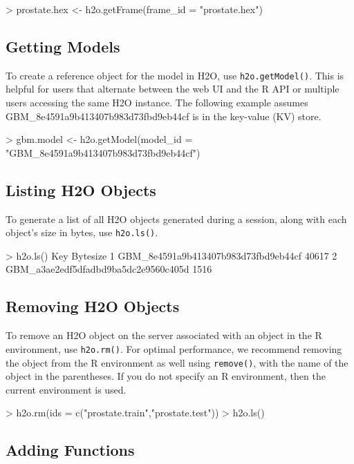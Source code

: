 \begin{spverbatim}
> prostate.hex <- h2o.getFrame(frame_id = "prostate.hex")
\end{spverbatim}


\subsection{Getting Models}
To create a reference object for the model in H2O, use {\texttt{h2o.getModel()}}. This is helpful for  users that alternate between the web UI and the R API or multiple users accessing the same H2O instance. The following example assumes GBM_8e4591a9b413407b983d73fbd9eb44cf is in the key-value (KV) store.
\begin{spverbatim}
> gbm.model <- h2o.getModel(model_id = "GBM_8e4591a9b413407b983d73fbd9eb44cf")
\end{spverbatim}

\subsection{Listing H2O Objects}

To generate a list of all H2O objects generated during a session, along with each object’s size in bytes, use {\texttt{h2o.ls()}}.

\begin{spverbatim}
> h2o.ls()
                                                   Key       Bytesize
      1               GBM_8e4591a9b413407b983d73fbd9eb44cf    40617
      2               GBM_a3ae2edf5dfadbd9ba5dc2e9560c405d     1516
\end{spverbatim}


\subsection{Removing H2O Objects}

To remove an H2O object on the server associated with an object in the R environment, use {\texttt{h2o.rm()}}. For optimal performance, we recommend removing the object from the R environment as well using {\texttt{remove()}}, with the name of the object in the parentheses. If you do not specify an R environment, then the current environment is used. 
\begin{spverbatim}
> h2o.rm(ids = c("prostate.train","prostate.test"))
> h2o.ls()
\end{spverbatim}


\subsection{Adding Functions}

